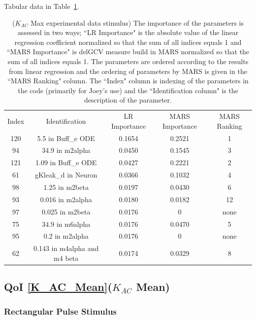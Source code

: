 \documentclass[12pt]{article}
\numberwithin{equation}{section}
\begin{document}
Tabular data in Table~\ref{qoi_K_AC_Max_ex}.

\begin{table}[h]
\centering
\begin{tabular}{ccccc}
Index & Identification & LR Importance & MARS Importance & MARS Ranking \\
120 & 5.5 in Buff\_e ODE & 0.1654 & 0.2521 & 1\\
94 & 34.9 in m2alpha & 0.0450 & 0.1545 & 3\\
121 & 1.09 in Buff\_e ODE &  0.0427 & 0.2221 & 2\\
61 & gKleak\_d in Neuron & 0.0366 & 0.1032 & 4\\
98 & 1.25 in m2beta & 0.0197 & 0.0430 & 6\\
93 & 0.016 in m2alpha & 0.0180 & 0.0182 & 12\\
97 & 0.025 in m2beta & 0.0176 &  0 & none\\
75 & 34.9 in m6alpha & 0.0176 & 0.0470 & 5\\
95 & 0.2 in m2alpha & 0.0176 & 0 & none\\
62 & 0.143 in m4alpha and m4 beta &  0.0174 & 0.0329 & 8\\
\end{tabular}
\caption{ ($K_{AC}$ Max experimental data stimulus) The importance of the parameters is assessed in two ways; ``LR Importance" is the absolute value of the linear regression coefficient normalized so that the sum of all indices equals 1 and ``MARS Importance" is delGCV measure build in MARS normalized so that the sum of all indices equals 1. The parameters are ordered according to the results from linear regression and the ordering of parameters by MARS is given in the ``MARS Ranking" column. The ``Index" column is indexing of the parameters in the code (primarily for Joey's use) and the ``Identification column" is the description of the parameter.}
\label{qoi_K_AC_Max_ex}
\end{table}

\newpage
\subsection{QoI \eqref{K_AC_Mean}($K_{AC}$ Mean)}

\subsubsection{Rectangular Pulse Stimulus}
\end{document}
